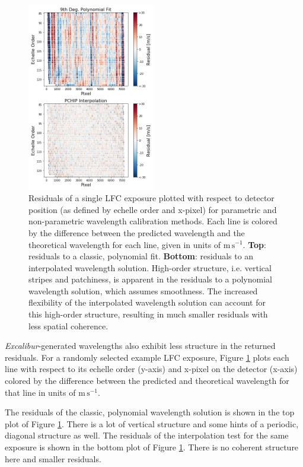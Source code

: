 \documentclass[modern]{aastex63}
\newcommand{\project}[1]{\textsl{#1}}
\newcommand{\name}{\project{Excalibur}}
\newcommand{\mps}{\mathrm{m\,s^{-1}}}
\begin{document}
\begin{figure}[t]
\centering
\includegraphics[width=0.5\textwidth]{Figures/lineResids2D_col.png}
\caption{Residuals of a single LFC exposure plotted with respect to detector position (as defined by echelle order and x-pixel) for parametric and non-parametric wavelength calibration methods.  Each line is colored by the difference between the predicted wavelength and the theoretical wavelength for each line, given in units of $\mps$.  \textbf{Top}: residuals to a classic, polynomial fit.  \textbf{Bottom}: residuals to an interpolated wavelength solution.  High-order structure, i.e. vertical stripes and patchiness, is apparent in the residuals to a polynomial wavelength solution, which assumes smoothness.  The increased flexibility of the interpolated wavelength solution can account for this high-order structure, resulting in much smaller residuals with less spatial coherence.}
\label{fig:resid2d}
\end{figure}

\name -generated wavelengths also exhibit less structure in the returned residuals.  For a randomly selected example LFC exposure, Figure \ref{fig:resid2d} plots each line with respect to its echelle order (y-axis) and x-pixel on the detector (x-axis) colored by the difference between the predicted and theoretical wavelength for that line in units of $\mps$.

The residuals of the classic, polynomial wavelength solution is shown in the top plot of Figure \ref{fig:resid2d}.  There is a lot of vertical structure and some hints of a periodic, diagonal structure as well.  The residuals of the interpolation test for the same exposure is shown in the bottom plot of Figure \ref{fig:resid2d}.  There is no coherent structure here and smaller residuals.
\end{document}
